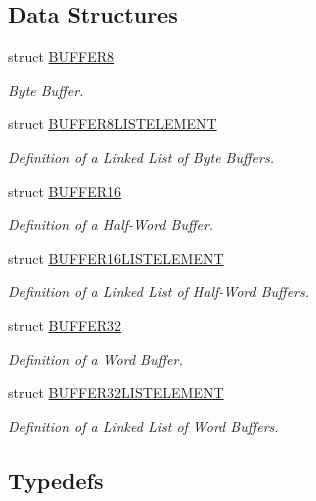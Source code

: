 \subsection*{Data Structures}
\begin{DoxyCompactItemize}
\item 
struct \hyperlink{a00006}{BUFFER8}
\begin{DoxyCompactList}\small\item\em Byte Buffer. \end{DoxyCompactList}\item 
struct \hyperlink{a00007}{BUFFER8LISTELEMENT}
\begin{DoxyCompactList}\small\item\em Definition of a Linked List of Byte Buffers. \end{DoxyCompactList}\item 
struct \hyperlink{a00002}{BUFFER16}
\begin{DoxyCompactList}\small\item\em Definition of a Half-\/Word Buffer. \end{DoxyCompactList}\item 
struct \hyperlink{a00003}{BUFFER16LISTELEMENT}
\begin{DoxyCompactList}\small\item\em Definition of a Linked List of Half-\/Word Buffers. \end{DoxyCompactList}\item 
struct \hyperlink{a00004}{BUFFER32}
\begin{DoxyCompactList}\small\item\em Definition of a Word Buffer. \end{DoxyCompactList}\item 
struct \hyperlink{a00005}{BUFFER32LISTELEMENT}
\begin{DoxyCompactList}\small\item\em Definition of a Linked List of Word Buffers. \end{DoxyCompactList}\end{DoxyCompactItemize}
\subsection*{Typedefs}
